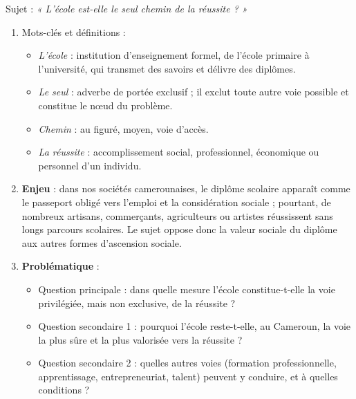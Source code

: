 \documentclass[11pt]{article}
\begin{document}
\begin{corrige}
Sujet : \emph{« L'école est-elle le seul chemin de la réussite ? »}
\begin{enumerate}
\item Mots-clés et définitions :
\begin{itemize}
\item \emph{L'école} : institution d'enseignement formel, de l'école primaire à l'université, qui transmet des savoirs et délivre des diplômes.
\item \emph{Le seul} : adverbe de portée exclusif ; il exclut toute autre voie possible et constitue le nœud du problème.
\item \emph{Chemin} : au figuré, moyen, voie d'accès.
\item \emph{La réussite} : accomplissement social, professionnel, économique ou personnel d'un individu.
\end{itemize}
\item \textbf{Enjeu} : dans nos sociétés camerounaises, le diplôme scolaire apparaît comme le passeport obligé vers l'emploi et la considération sociale ; pourtant, de nombreux artisans, commerçants, agriculteurs ou artistes réussissent sans longs parcours scolaires. Le sujet oppose donc la valeur sociale du diplôme aux autres formes d'ascension sociale.
\item \textbf{Problématique} :
\begin{itemize}
\item Question principale : dans quelle mesure l'école constitue-t-elle la voie privilégiée, mais non exclusive, de la réussite ?
\item Question secondaire 1 : pourquoi l'école reste-t-elle, au Cameroun, la voie la plus sûre et la plus valorisée vers la réussite ?
\item Question secondaire 2 : quelles autres voies (formation professionnelle, apprentissage, entrepreneuriat, talent) peuvent y conduire, et à quelles conditions ?
\end{itemize}
\end{enumerate}
\end{corrige}
\end{document}
